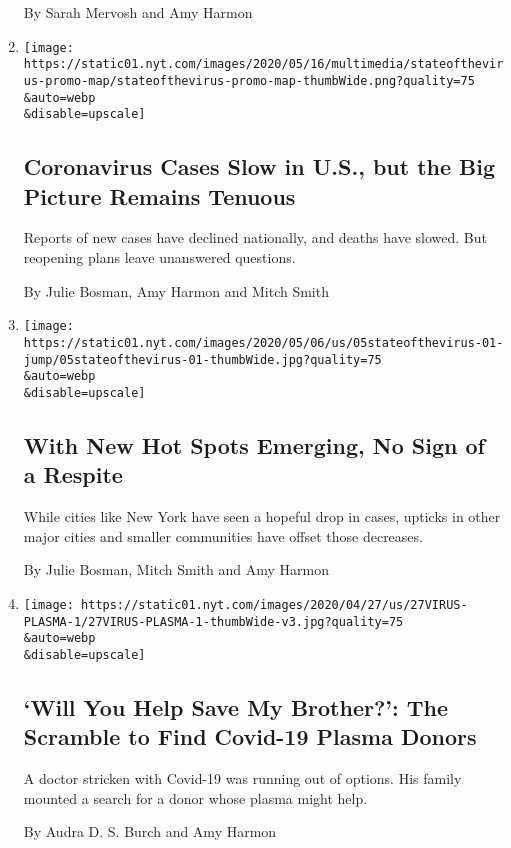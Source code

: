 \begin{enumerate}
  By Sarah Mervosh and Amy Harmon
\item
  \href{/2020/05/16/us/coronavirus-united-states.html}{}

  \texttt{[image: https://static01.nyt.com/images/2020/05/16/multimedia/stateofthevirus-promo-map/stateofthevirus-promo-map-thumbWide.png?quality=75\\\&auto=webp\\\&disable=upscale]}

  \hypertarget{coronavirus-cases-slow-in-us-but-the-big-picture-remains-tenuous}{%
  \subsection{Coronavirus Cases Slow in U.S., but the Big Picture
  Remains
  Tenuous}\label{coronavirus-cases-slow-in-us-but-the-big-picture-remains-tenuous}}

  Reports of new cases have declined nationally, and deaths have slowed.
  But reopening plans leave unanswered questions.

  By Julie Bosman, Amy Harmon and Mitch Smith
\item
  \href{/2020/05/05/us/coronavirus-deaths-cases-united-states.html}{}

  \texttt{[image: https://static01.nyt.com/images/2020/05/06/us/05stateofthevirus-01-jump/05stateofthevirus-01-thumbWide.jpg?quality=75\\\&auto=webp\\\&disable=upscale]}

  \hypertarget{with-new-hot-spots-emerging-no-sign-of-a-respite}{%
  \subsection{With New Hot Spots Emerging, No Sign of a
  Respite}\label{with-new-hot-spots-emerging-no-sign-of-a-respite}}

  While cities like New York have seen a hopeful drop in cases, upticks
  in other major cities and smaller communities have offset those
  decreases.

  By Julie Bosman, Mitch Smith and Amy Harmon
\item
  \href{/2020/04/29/us/coronavirus-plasma-donors.html}{}

  \texttt{[image: https://static01.nyt.com/images/2020/04/27/us/27VIRUS-PLASMA-1/27VIRUS-PLASMA-1-thumbWide-v3.jpg?quality=75\\\&auto=webp\\\&disable=upscale]}

  \hypertarget{will-you-help-save-my-brother-the-scramble-to-find-covid-19-plasma-donors}{%
  \subsection{`Will You Help Save My Brother?': The Scramble to Find
  Covid-19 Plasma
  Donors}\label{will-you-help-save-my-brother-the-scramble-to-find-covid-19-plasma-donors}}

  A doctor stricken with Covid-19 was running out of options. His family
  mounted a search for a donor whose plasma might help.

  By Audra D. S. Burch and Amy Harmon
\end{enumerate}

